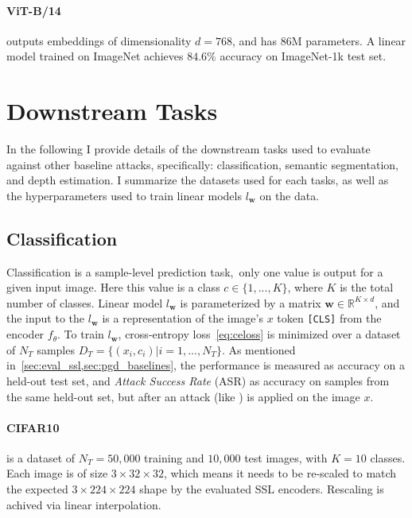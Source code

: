 \paragraph{ViT-B/14} outputs embeddings of dimensionality $d=768$, and has 86M parameters. A linear model trained on ImageNet achieves $84.6\%$ accuracy on ImageNet-1k test set.

\section{Downstream Tasks}

In the following I provide details of the downstream tasks used to evaluate \EmbedAttack against other baseline attacks, specifically: classification, semantic segmentation, and depth estimation. I summarize the datasets used for each tasks, as well as the hyperparameters used to train linear models $l_\mathbf{w}$ on the data.

\subsection{Classification}\label{sec:eval_clf}

Classification is a sample-level prediction task,~\ie only one value is output for a given input image. Here this value is a class $c\in\{1,...,K\}$, where $K$ is the total number of classes. Linear model $l_\mathbf{w}$ is parameterized by a matrix $\mathbf{w}\in\mathbb{R}^{K\times d}$, and the input to the $l_\mathbf{w}$ is a representation of the image's $x$ token \texttt{[CLS]} from the encoder $f_\theta$. To train $l_\mathbf{w}$, cross-entropy loss~\cref{eq:celoss} is minimized over a dataset of $N_T$ samples $D_T=\{(x_i,c_i)|i=1,...,N_T\}$. As mentioned in~\cref{sec:eval_ssl,sec:pgd_baselines}, the performance is measured as accuracy on a held-out test set, and \textit{Attack Success Rate} (ASR) as accuracy on samples from the same held-out set, but after an attack (like \EmbedAttack) is applied on the image $x$.

\paragraph{CIFAR10~\cite{cifar}} is a dataset of $N_T=50,000$ training and $10,000$ test images, with $K=10$ classes. Each image is of size $3\times 32\times 32$, which means it needs to be re-scaled to match the expected $3\times 224\times 224$ shape by the evaluated SSL encoders. Rescaling is achived via linear interpolation.

